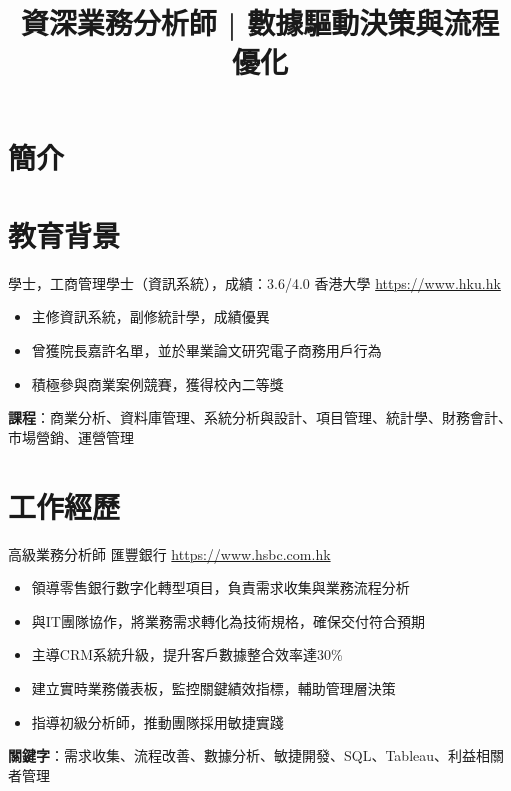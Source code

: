 \documentclass[a4paper, serif, 10pt]{moderncv}
\title{資深業務分析師 | 數據驅動決策與流程優化}
\begin{document}
\maketitle

\section{簡介}

\section{教育背景}

        {學士，工商管理學士（資訊系統），成績：3.6/4.0}
        {香港大學}
        {\url{https://www.hku.hk}}
        {}
        {\begin{itemize}
\item 主修資訊系統，副修統計學，成績優異
\item 曾獲院長嘉許名單，並於畢業論文研究電子商務用戶行為
\item 積極參與商業案例競賽，獲得校內二等獎
\end{itemize}
\textbf{課程}：商業分析、資料庫管理、系統分析與設計、項目管理、統計學、財務會計、市場營銷、運營管理}
\section{工作經歷}

        {高級業務分析師}
        {匯豐銀行}
        {\url{https://www.hsbc.com.hk}}
        {}
        {\begin{itemize}
\item 領導零售銀行數字化轉型項目，負責需求收集與業務流程分析
\item 與IT團隊協作，將業務需求轉化為技術規格，確保交付符合預期
\item 主導CRM系統升級，提升客戶數據整合效率達30\%
\item 建立實時業務儀表板，監控關鍵績效指標，輔助管理層決策
\item 指導初級分析師，推動團隊採用敏捷實踐
\end{itemize}
\textbf{關鍵字}：需求收集、流程改善、數據分析、敏捷開發、SQL、Tableau、利益相關者管理}
\end{document}
